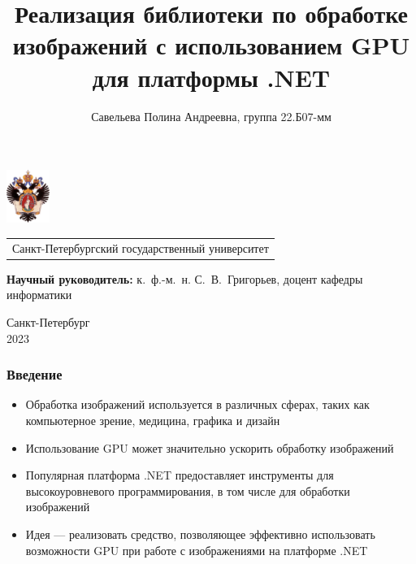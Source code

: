 \documentclass[aspectratio=169]{beamer}
\title[GPU Image Processing]{Реализация библиотеки по обработке изображений с использованием GPU для платформы .NET}
\institute[СПбГУ]{}
\author[Савельева Полина]{Савельева Полина Андреевна, группа 22.Б07-мм}
\begin{document}
{
\begin{frame}
  \includegraphics[width=1.4cm]{pictures/SPbGU_Logo.png}
\vspace{-35pt}
\hspace{-10pt}
\begin{center}
   \begin{tabular}{c}
        \scriptsize{Санкт-Петербургский государственный университет} \\
    \end{tabular}
\titlepage
\end{center}

\btVFill

{\scriptsize
   \textbf{Научный руководитель:} к.~ф.-м.~н. С.~В.~Григорьев, доцент кафедры информатики \\
 }
\begin{center}
  \vspace{5pt}
  \scriptsize{Санкт-Петербург\\
                 2023}
  \end{center}

\end{frame}
}

\begin{frame}[fragile]  
  \frametitle{Введение}
  \begin{itemize}
    \item Обработка изображений используется в различных сферах, таких как компьютерное зрение, медицина, графика и дизайн
    \item Использование GPU может значительно ускорить обработку изображений
    \item Популярная платформа .NET предоставляет инструменты для высокоуровневого программирования, в том числе для обработки изображений 
    \item Идея --- реализовать средство, позволяющее эффективно использовать возможности GPU при работе с изображениями на платформе .NET
  \end{itemize}
\end{frame}
            
\end{document}
